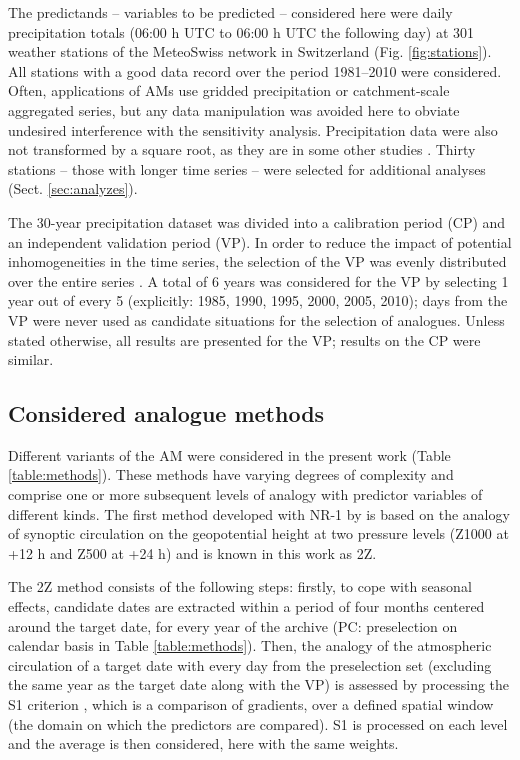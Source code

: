 \documentclass[smallextended]{svjour3}       %
\begin{document}
	The predictands -- variables to be predicted -- considered here were daily precipitation totals (06:00 h UTC to 06:00 h UTC the following day) at 301 weather stations of the MeteoSwiss network in Switzerland (Fig. \ref{fig:stations}). All stations with a good data record over the period 1981--2010 were considered. Often, applications of AMs use gridded precipitation or catchment-scale aggregated series, but any data manipulation was avoided here to obviate undesired interference with the sensitivity analysis. Precipitation data were also not transformed by a square root, as they are in some other studies \cite[see e.g.][]{Bontron2004}. Thirty stations -- those with longer time series -- were selected for additional analyses (Sect. \ref{sec:analyzes}).
	
	The 30-year precipitation dataset was divided into a calibration period (CP) and an independent validation period (VP). In order to reduce the impact of potential inhomogeneities in the time series, the selection of the VP was evenly distributed over the entire series \citep[as in][]{BenDaoud2010}. A total of 6 years was considered for the VP by selecting 1 year out of every 5 (explicitly: 1985, 1990, 1995, 2000, 2005, 2010); days from the VP were never used as candidate situations for the selection of analogues. Unless stated otherwise, all results are presented for the VP; results on the CP were similar.
	
	
	\subsection{Considered analogue methods}
	\label{sec:ams}
	
	Different variants of the AM were considered in the present work (Table \ref{table:methods}). These methods have varying degrees of complexity and comprise one or more subsequent levels of analogy with predictor variables of different kinds. The first method developed with NR-1 by \citet{Bontron2004} is based on the analogy of synoptic circulation on the geopotential height at two pressure levels (Z1000 at +12 h and Z500 at +24 h) and is known in this work as 2Z.
	
	The 2Z method consists of the following steps: firstly, to cope with seasonal effects, candidate dates are extracted within a period of four months centered around the target date, for every year of the archive (PC: preselection on calendar basis in Table \ref{table:methods}). Then, the analogy of the atmospheric circulation of a target date with every day from the preselection set (excluding the same year as the target date along with the VP) is assessed by processing the S1 criterion \citep[Eq.\ \ref{eq:S1}, ][]{Teweles1954, Brown2012}, which is a comparison of gradients, over a defined spatial window (the domain on which the predictors are compared). S1 is processed on each level and the average is then considered, here with the same weights.
	
\end{document}
